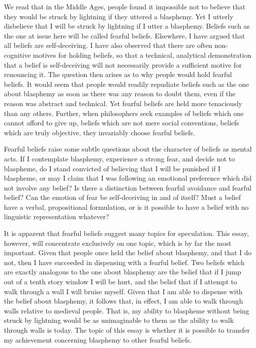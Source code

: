 
We read that in the Middle Ages, people found it impossible not to believe that they would be struck by lightning if they uttered a blasphemy. Yet I utterly disbelieve that I will be struck by lightning if I utter a blasphemy. Beliefs such as the one at issue here will be called fearful beliefs. Elsewhere, I have argued that all beliefs are self-deceiving. I have also observed that there are often non-cognitive motives for holding beliefs, so that a technical, analytical demonstration that a belief is self-deceiving will not necessarily provide a sufficient motive for renouncing it. The question then arises as to why people would hold fearful beliefs. It would seem that people would readily repudiate beliefs such as the one about blasphemy as soon as there was any reason to doubt them, even if the reason was abstract and technical. Yet fearful beliefs are held more tenaciously than any others. Further, when philosophers seek examples of beliefs which one cannot afford to give up, beliefs which are not mere social conventions, beliefs which are truly objective, they invariably choose fearful beliefs. 

Fearful beliefs raise some subtle questions about the character of beliefs as mental acts. If I contemplate blasphemy, experience a strong fear, and decide not to blaspheme, do I stand convicted of believing that I will be punished if I blaspheme, or may I claim that I was following an emotional preference which did not involve any belief? Is there a distinction between fearful avoidance and fearful belief? Can the emotion of fear be self-deceiving in and of itself? Must a belief have a verbal, propositional formulation, or is it possible to have a belief with no linguistic representation whatever? 

It is apparent that fearful beliefs suggest many topics for speculation. This essay, however, will concentrate exclusively on one topic, which is by far the most important. Given that people once held the belief about blasphemy, and that I do not, then I have succeeded in dispensing with a fearful belief. Two beliefs which are exactly analogous to the one about blasphemy are the belief that if I jump out of a tenth story window I will be hurt, and the belief that if I attempt to walk through a wall I will bruise myself. Given that I am able to dispense with the belief about blasphemy, it follows that, in effect, I am able to walk through walls relative to medieval people. That is, my ability to blaspheme without being struck by lightning would be as unimaginable to them as the ability to walk through walls is today. The topic of this essay is whether it is possible to transfer my achievement concerning blasphemy to other fearful beliefs. 

